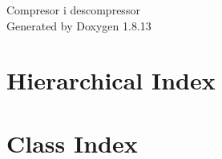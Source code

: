 \documentclass[twoside]{book}
\newcommand{\+}{\discretionary{\mbox{\scriptsize$\hookleftarrow$}}{}{}}
\newcommand{\clearemptydoublepage}{%
  \newpage{\pagestyle{empty}\cleardoublepage}%
}
\begin{document}
\hypersetup{pageanchor=false,
             bookmarksnumbered=true,
             pdfencoding=unicode
            }
\begin{titlepage}
\vspace*{7cm}
\begin{center}%
{\Large Compresor i descompressor }\\
\vspace*{1cm}
{\large Generated by Doxygen 1.8.13}\\
\end{center}
\end{titlepage}
\clearemptydoublepage
{}
\tableofcontents
\clearemptydoublepage
{}
\hypersetup{pageanchor=true}

\chapter{Hierarchical Index}

\chapter{Class Index}

\end{document}
